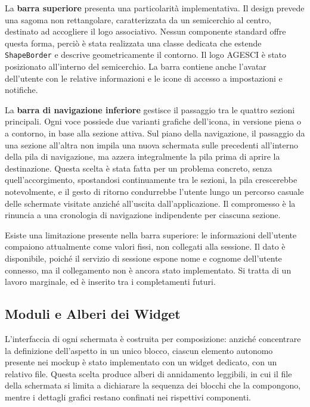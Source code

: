 \documentclass[11pt]{article}
\numberwithin{figure}{section}
\begin{document}
La \textbf{barra superiore} presenta una particolarità implementativa. Il design prevede una sagoma non rettangolare, caratterizzata da un semicerchio al centro, destinato ad accogliere il logo associativo. Nessun componente standard offre questa forma, perciò è stata realizzata una classe dedicata che estende \texttt{ShapeBorder} e descrive geometricamente il contorno. Il logo AGESCI è stato posizionato all'interno del semicerchio. La barra contiene anche l'avatar dell'utente con le relative informazioni e le icone di accesso a impostazioni e notifiche.

La \textbf{barra di navigazione inferiore} gestisce il passaggio tra le quattro sezioni principali. Ogni voce possiede due varianti grafiche dell'icona, in versione piena o a contorno, in base alla sezione attiva. Sul piano della navigazione, il passaggio da una sezione all'altra non impila una nuova schermata sulle precedenti all'interno della pila di navigazione, ma azzera integralmente la pila prima di aprire la destinazione. Questa scelta è stata fatta per un problema concreto, senza quell'accorgimento, spostandosi continuamente tra le sezioni, la pila crescerebbe notevolmente, e il gesto di ritorno condurrebbe l'utente lungo un percorso casuale delle schermate visitate anziché all'uscita dall'applicazione. Il compromesso è la rinuncia a una cronologia di navigazione indipendente per ciascuna sezione.

Esiste una limitazione presente nella barra superiore: le informazioni dell'utente compaiono attualmente come valori fissi, non collegati alla sessione. Il dato è disponibile, poiché il servizio di sessione espone nome e cognome dell'utente connesso, ma il collegamento non è ancora stato implementato. Si tratta di un lavoro marginale, ed è inserito tra i completamenti futuri.

\subsection{Moduli e Alberi dei Widget}

L'interfaccia di ogni schermata è costruita per composizione: anziché concentrare la definizione dell'aspetto in un unico blocco, ciascun elemento autonomo presente nei mockup è stato implementato con un widget dedicato, con un relativo file. Questa scelta produce alberi di annidamento leggibili, in cui il file della schermata si limita a dichiarare la sequenza dei blocchi che la compongono, mentre i dettagli grafici restano confinati nei rispettivi componenti.
\end{document}
